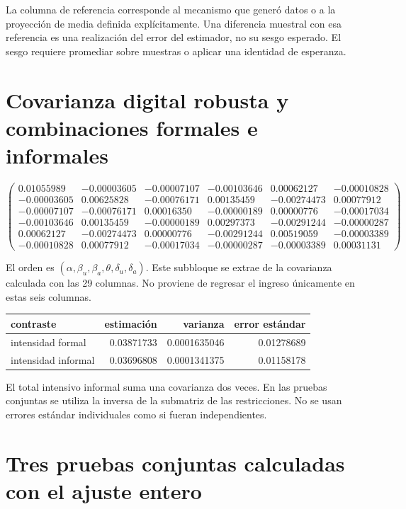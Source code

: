 \documentclass[11pt,a4paper]{article}
\begin{document}
La columna de referencia corresponde al mecanismo que generó datos o a la proyección de media definida explícitamente. Una diferencia muestral con esa referencia es una realización del error del estimador, no su sesgo esperado. El sesgo requiere promediar sobre muestras o aplicar una identidad de esperanza.

\clearpage
\section{Covarianza digital robusta y combinaciones formales e informales}

\[
\begin{pmatrix}0.01055989 & -0.00003605 & -0.00007107 & -0.00103646 & 0.00062127 & -0.00010828\\-0.00003605 & 0.00625828 & -0.00076171 & 0.00135459 & -0.00274473 & 0.00077912\\-0.00007107 & -0.00076171 & 0.00016350 & -0.00000189 & 0.00000776 & -0.00017034\\-0.00103646 & 0.00135459 & -0.00000189 & 0.00297373 & -0.00291244 & -0.00000287\\0.00062127 & -0.00274473 & 0.00000776 & -0.00291244 & 0.00519059 & -0.00003389\\-0.00010828 & 0.00077912 & -0.00017034 & -0.00000287 & -0.00003389 & 0.00031131\end{pmatrix}
\]

El orden es $(\alpha,\beta_u,\beta_a,\theta,\delta_u,\delta_a)$. Este subbloque se extrae de la covarianza calculada con las 29 columnas. No proviene de regresar el ingreso únicamente en estas seis columnas.

\begin{center}\small
\begin{tabular}{lrrr}
\toprule
contraste & estimación & varianza & error estándar\\\midrule
intensidad formal & 0.03871733 & 0.0001635046 & 0.01278689\\
intensidad informal & 0.03696808 & 0.0001341375 & 0.01158178\\
\bottomrule
\end{tabular}\end{center}

El total intensivo informal suma una covarianza dos veces. En las pruebas conjuntas se utiliza la inversa de la submatriz de las restricciones. No se usan errores estándar individuales como si fueran independientes.

\clearpage
\section{Tres pruebas conjuntas calculadas con el ajuste entero}
\end{document}
